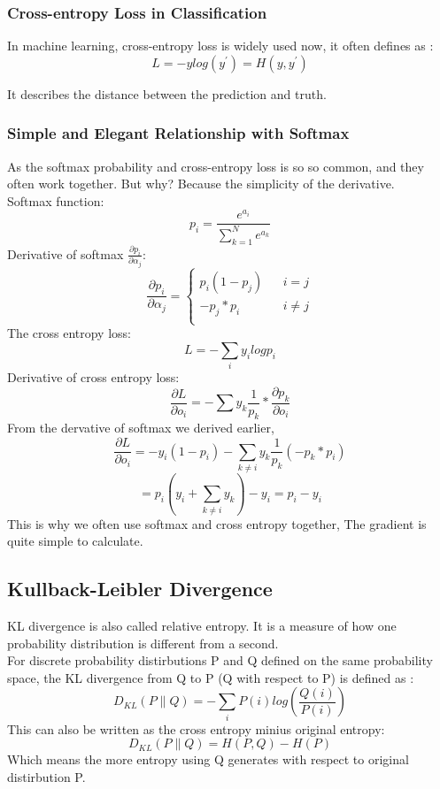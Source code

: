 \documentclass{article}
\begin{document}
\subsubsection{Cross-entropy Loss in Classification}
In machine learning, cross-entropy loss is widely used now, it often defines as : 
$$L=-ylog(y^{'})=H(y,y^{'})$$

It describes the distance between the prediction and truth.
\subsubsection{Simple and Elegant Relationship with Softmax}
As the softmax probability and cross-entropy loss is so so common, and they often work together. But why? Because the simplicity of the derivative. \\
Softmax function:
$$p_{i}=\frac{e^{a_{i}}}{\sum_{k=1}^{N}e^{a_{k}}}$$
Derivative of softmax $\frac{\partial p_{i}}{\partial \alpha_{j}}$: \\
\begin{equation}
\nonumber
\frac{\partial p_{i}}{\partial \alpha_{j}}=\left\{
\begin{aligned}
p_{i}(1-p_{j}) & & i=j \\
-p_{j}*p_{i}  && i\neq j \\
\end{aligned}
\right.
\end{equation}
The cross entropy loss:
$$L=-\sum_{i}y_{i}logp_{i}$$
Derivative of cross entropy loss:
$$\frac{\partial L}{\partial o_{i}}=-\sum y_{k}\frac{1}{p_{k}}*\frac{\partial p_{k}}{\partial o_{i}}$$
From the dervative of softmax we derived earlier,
$$\frac{\partial L}{\partial o_{i}}=-y_{i}(1-p_{i})-\sum_{k \neq i}y_{k}\frac{1}{p_{k}}(-p_{k}*p_{i})$$
$$=p_{i}(y_{i}+\sum _{k \neq i}y_{k})-y_{i}=p_{i}-y_{i}$$
This is why we often use softmax and cross entropy together, The gradient is quite simple to calculate. 
\subsection{Kullback-Leibler Divergence}
KL divergence is also called relative entropy. It is a measure of how one probability distribution is different from a second.\\
For discrete probability distirbutions P and Q defined on the same probability space, the KL divergence from Q to P (Q with respect to P) is defined as :
$$D_{KL}(P \parallel Q)=-\sum_{i}P(i)log(\frac{Q(i)}{P(i)})$$
This can also be written as the cross entropy minius original entropy: 
$$D_{KL}(P \parallel Q)=H(P,Q)-H(P)$$
Which means the more entropy using Q generates with respect to original distirbution P.
\end{document}
